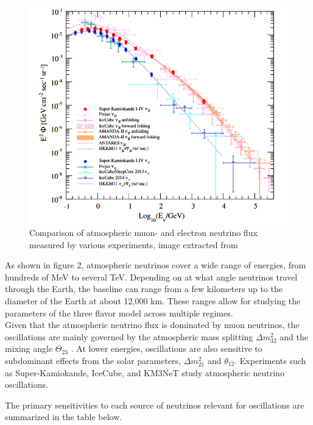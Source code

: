 \documentclass[a4paper,12pt,numbered]{article}
\begin{document}
\begin{figure}[H]
\includegraphics[width=\textwidth]{Neutrino_Figures/atmospheric_neu_flux.png}
\caption{Comparison of atmospheric muon- and electron neutrino flux measured by various experiments, image extracted from \cite{atmospheric_neutrino_flux_superkamiokande}}
\end{figure}

As shown in figure 2, atmospheric neutrinos cover a wide range of energies, from hundreds of MeV to several TeV. Depending on at what angle neutrinos travel through the Earth, the baseline can range from a few kilometers up to the diameter of the Earth at about 12,000 km. These ranges allow for studying the parameters of the three flavor model across multiple regimes.
\\
Given that the atmospheric neutrino flux is dominated by muon neutrinos, the oscillations are mainly governed by the atmospheric mass splitting $\Delta m_{32}^2$ and the mixing angle $\Theta_{23}$ . At lower energies, oscillations are also sensitive to subdominant effects from the solar parameters, $\Delta m^2_{21}$ and $\theta_{12}$. Experiments such as Super-Kamiokande, IceCube, and KM3NeT study atmospheric neutrino oscillations.

The primary sensitivities to each source of neutrinos relevant for oscillations are summarized in the table below.
\end{document}
